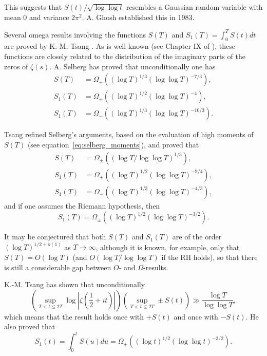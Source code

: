 \documentclass[11pt]{article}
\begin{document}
This suggests that $S(t)/\sqrt{\log \log t}$ resembles a Gaussian random variable with mean 0 and variance $2\pi^2$. A. Ghosh \cite{Gho} established this in 1983.

Several omega results involving the functions $S(T)$ and $S_1(T) = \int_0^T S(t) dt$ are proved by K.-M. Tsang \cite{Tsa1}. As is well-known (see Chapter IX of \cite{Tit3}), these functions are closely related to the distribution of the imaginary parts of the zeros of $\zeta(s)$. A. Selberg \cite{Sel} has proved that unconditionally one has
\begin{align}\label{eq:selberg_omega}
S(T) &= \Omega_{\pm}((\log T)^{1/3}(\log \log T)^{-7/3}), \\
S_1(T) &= \Omega_{+}((\log T)^{1/2}(\log \log T)^{-4}), \nonumber \\
S_1(T) &= \Omega_{-}((\log T)^{1/3}(\log \log T)^{-10/3}). \nonumber
\end{align}

Tsang refined Selberg's arguments, based on the evaluation of high moments of $S(T)$ (see equation~\eqref{eq:selberg_moments}), and proved that
\begin{align}\label{eq:tsang_omega}
S(T) &= \Omega_{\pm}((\log T/ \log \log T)^{1/3}), \\
S_1(T) &= \Omega_{+}((\log T)^{1/2}(\log \log T)^{-9/4}), \nonumber \\
S_1(T) &= \Omega_{-}((\log T)^{1/3}(\log \log T)^{-4/3}), \nonumber
\end{align}
and if one assumes the Riemann hypothesis, then
\begin{equation}\label{eq:tsang_rh}
S_1(T) = \Omega_{\pm}((\log T)^{1/2}(\log \log T)^{-3/2}).
\end{equation}

It may be conjectured that both $S(T)$ and $S_1(T)$ are of the order $(\log T)^{1/2+o(1)}$ as $T \to \infty$, although it is known, for example, only that $S(T) = O(\log T)$ (and $O(\log T/ \log \log T)$ if the RH holds), so that there is still a considerable gap between $O$- and $\Omega$-results.

K.-M. Tsang \cite{Tsa2} has shown that unconditionally
\begin{equation}\label{eq:tsang_sup}
\left(\sup_{T < t \leq 2T} \log \left|\zeta\left(\frac{1}{2} + it\right)\right|\right) \left(\sup_{T < t \leq 2T} \pm S(t)\right) \gg \frac{\log T}{\log \log T},
\end{equation}
which means that the result holds once with $+S(t)$ and once with $-S(t)$. He also proved that
\begin{equation}\label{eq:tsang_s1}
S_1(t) = \int_0^t S(u) du = \Omega_{+}((\log t)^{1/2}(\log \log t)^{-3/2}).
\end{equation}
\end{document}
